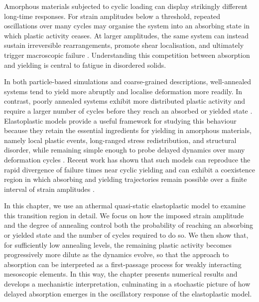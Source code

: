 Amorphous materials subjected to cyclic loading can display strikingly different long-time responses. For strain amplitudes below a threshold, repeated oscillations over many cycles may organise the system into an absorbing state in which plastic activity ceases. At larger amplitudes, the same system can instead sustain irreversible rearrangements, promote shear localisation, and ultimately trigger macroscopic failure \cite{pineChaosThresholdIrreversibility2005,Cort2008,Fiocco2013,Regev_onset_2013,kawasakiMacroscopicYieldingJammed2016,Leishangthem2017,JocteurYielding2024}. Understanding this competition between absorption and yielding is central to fatigue in disordered solids.

In both particle-based simulations and coarse-grained descriptions, well-annealed systems tend to yield more abruptly and localise deformation more readily. In contrast, poorly annealed systems exhibit more distributed plastic activity and require a larger number of cycles before they reach an absorbed or yielded state \cite{Leishangthem2017,Popovi2018,barlow_ductile_2020,liuFateShearoscillatedAmorphous2022}. Elastoplastic models provide a useful framework for studying this behaviour because they retain the essential ingredients for yielding in amorphous materials, namely local plastic events, long-ranged stress redistribution, and structural disorder, while remaining simple enough to probe delayed dynamics over many deformation cycles \cite{nicolas_deformation_2018,pollard_yielding_2022}. Recent work has shown that such models can reproduce the rapid divergence of failure times near cyclic yielding and can exhibit a coexistence region in which absorbing and yielding trajectories remain possible over a finite interval of strain amplitudes \cite{khandareElastoplasticModellingCyclic2026,cochran_slow_2024}.

In this chapter, we use an athermal quasi-static elastoplastic model to examine this transition region in detail. We focus on how the imposed strain amplitude and the degree of annealing control both the probability of reaching an absorbing or yielded state and the number of cycles required to do so. We then show that, for sufficiently low annealing levels, the remaining plastic activity becomes progressively more dilute as the dynamics evolve, so that the approach to absorption can be interpreted as a first-passage process for weakly interacting mesoscopic elements. In this way, the chapter presents numerical results and develops a mechanistic interpretation, culminating in a stochastic picture of how delayed absorption emerges in the oscillatory response of the elastoplastic model.

